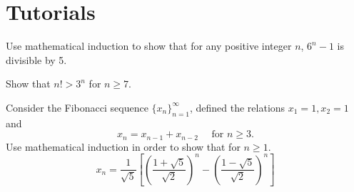 \section*{Tutorials}

\begin{mdframed}
    \vspace{-0.25cm}
    \hspace{-0.25cm}
    \begin{Exercise}
        Use mathematical induction to show that for any positive integer $n$, $6^n - 1$ is divisible by 5.
    \end{Exercise}

    \begin{Exercise}
        Show that $n! > 3^n$ for $n \geq 7$.
    \end{Exercise}

    \begin{Exercise}
        Consider the Fibonacci sequence $\{x_n \}^\infty_{n=1}$, defined the relations 
        $x_1 =1, x_2 =1$ and
        \[
            x_n = x_{n-1} + x_{n-2} \quad \text{ for } n \geq 3.
        \]
        Use mathematical induction in order to show that for $n \geq 1$.
        \[
            x_n = \frac{1}{\sqrt{5}} \left[ \left(\frac{1 + \sqrt{5} }{\sqrt{2}} \right)^n - \left(\frac{1 - \sqrt{5} }{\sqrt{2}} \right)^n\right]
        \]
    \end{Exercise}
\end{mdframed}